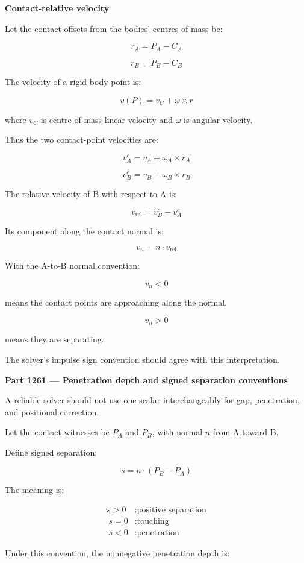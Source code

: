 \textbf{Contact-relative velocity}

Let the contact offsets from the bodies' centres of mass be:

\[
r_A=P_A-C_A
\]

\[
r_B=P_B-C_B
\]

The velocity of a rigid-body point is:

\[
\boxed{ v(P)=v_C+\omega\times r }
\]

where \(v_C\) is centre-of-mass linear velocity and \(\omega\) is angular velocity.

Thus the two contact-point velocities are:

\[
v_A^c=v_A+\omega_A\times r_A
\]

\[
v_B^c=v_B+\omega_B\times r_B
\]

The relative velocity of B with respect to A is:

\[
\boxed{ v_{\mathrm{rel}}=v_B^c-v_A^c }
\]

Its component along the contact normal is:

\[
\boxed{ v_n=n\cdot v_{\mathrm{rel}} }
\]

With the A-to-B normal convention:

\[
v_n<0
\]

means the contact points are approaching along the normal.

\[
v_n>0
\]

means they are separating.

The solver's impulse sign convention should agree with this interpretation.

\textbf{Part 1261 --- Penetration depth and signed separation conventions}

A reliable solver should not use one scalar interchangeably for gap, penetration, and positional correction.

Let the contact witnesses be \(P_A\) and \(P_B\), with normal \(n\) from A toward B.

Define signed separation:

\[
\boxed{ s=n\cdot(P_B-P_A) }
\]

The meaning is:

\[
\boxed{ \begin{aligned} s>0 &: \text{positive separation}\\\ s=0 &: \text{touching}\\\ s<0 &: \text{penetration} \end{aligned} }
\]

Under this convention, the nonnegative penetration depth is:

